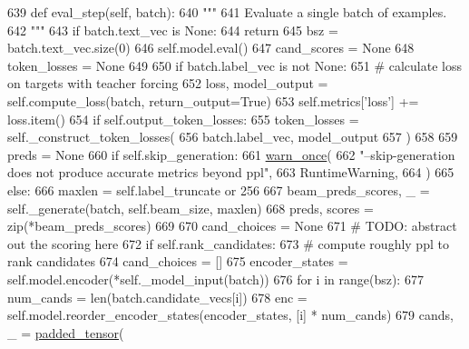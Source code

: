 \begin{DoxyCode}
639     \textcolor{keyword}{def }eval\_step(self, batch):
640         \textcolor{stringliteral}{"""}
641 \textcolor{stringliteral}{        Evaluate a single batch of examples.}
642 \textcolor{stringliteral}{        """}
643         \textcolor{keywordflow}{if} batch.text\_vec \textcolor{keywordflow}{is} \textcolor{keywordtype}{None}:
644             \textcolor{keywordflow}{return}
645         bsz = batch.text\_vec.size(0)
646         self.model.eval()
647         cand\_scores = \textcolor{keywordtype}{None}
648         token\_losses = \textcolor{keywordtype}{None}
649 
650         \textcolor{keywordflow}{if} batch.label\_vec \textcolor{keywordflow}{is} \textcolor{keywordflow}{not} \textcolor{keywordtype}{None}:
651             \textcolor{comment}{# calculate loss on targets with teacher forcing}
652             loss, model\_output = self.compute\_loss(batch, return\_output=\textcolor{keyword}{True})
653             self.metrics[\textcolor{stringliteral}{'loss'}] += loss.item()
654             \textcolor{keywordflow}{if} self.output\_token\_losses:
655                 token\_losses = self.\_construct\_token\_losses(
656                     batch.label\_vec, model\_output
657                 )
658 
659         preds = \textcolor{keywordtype}{None}
660         \textcolor{keywordflow}{if} self.skip\_generation:
661             \hyperlink{namespaceparlai_1_1utils_1_1misc_acf146e70ea7f6867969a7c2b545d4b4b}{warn\_once}(
662                 \textcolor{stringliteral}{"--skip-generation does not produce accurate metrics beyond ppl"},
663                 RuntimeWarning,
664             )
665         \textcolor{keywordflow}{else}:
666             maxlen = self.label\_truncate \textcolor{keywordflow}{or} 256
667             beam\_preds\_scores, \_ = self.\_generate(batch, self.beam\_size, maxlen)
668             preds, scores = zip(*beam\_preds\_scores)
669 
670         cand\_choices = \textcolor{keywordtype}{None}
671         \textcolor{comment}{# TODO: abstract out the scoring here}
672         \textcolor{keywordflow}{if} self.rank\_candidates:
673             \textcolor{comment}{# compute roughly ppl to rank candidates}
674             cand\_choices = []
675             encoder\_states = self.model.encoder(*self.\_model\_input(batch))
676             \textcolor{keywordflow}{for} i \textcolor{keywordflow}{in} range(bsz):
677                 num\_cands = len(batch.candidate\_vecs[i])
678                 enc = self.model.reorder\_encoder\_states(encoder\_states, [i] * num\_cands)
679                 cands, \_ = \hyperlink{namespaceparlai_1_1agents_1_1legacy__agents_1_1seq2seq_1_1utils__v1_adb5a414ae439f14c54e8c760b91cc4c8}{padded\_tensor}(

\end{DoxyCode}

